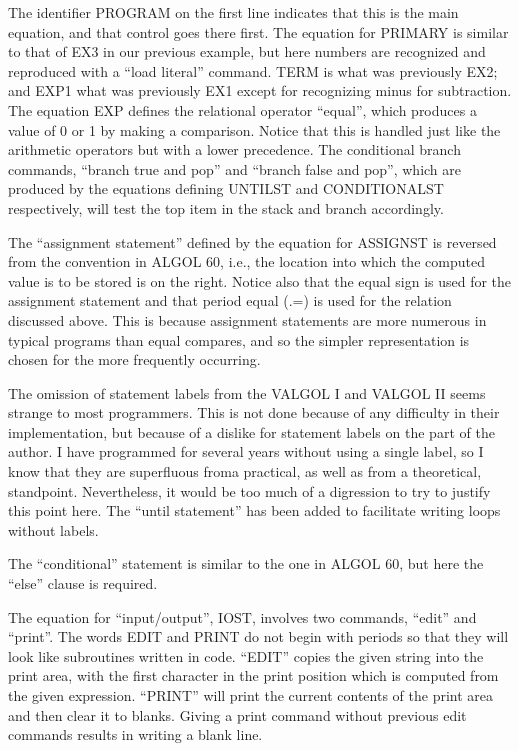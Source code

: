 \documentclass[twocolumn]{article}
\begin{document}
The identifier PROGRAM on the first line indicates that this is the main
equation, and that control goes there first.
The equation for PRIMARY is similar to that of EX3 in our previous example,
but here numbers are recognized and reproduced with a ``load literal'' command.
TERM is what was previously EX2; and EXP1 what was previously EX1 except for
recognizing minus for subtraction.
The equation EXP defines the relational operator ``equal'', which produces a
value of 0 or 1 by making a comparison.
Notice that this is handled just like the arithmetic operators but with a
lower precedence. The conditional branch commands, ``branch true and pop'' and
``branch false and pop'', which are produced by the equations defining UNTILST
and CONDITIONALST respectively, will test the top item in the stack and branch
accordingly.

The ``assignment statement'' defined by the equation for ASSIGNST is reversed
from the convention in ALGOL 60, i.e., the location into which the computed 
value is to be stored is on the right.
Notice also that the equal sign is used for the assignment statement and that
period equal (.=) is used for the relation discussed above.
This is because assignment statements are more numerous in typical programs than
equal compares, and so the simpler representation is chosen for the more
frequently occurring.

The omission of statement labels from the VALGOL I and VALGOL II seems strange
to most programmers. This is not done because of any difficulty in their
implementation, but because of a dislike for statement labels on the part of
the author. I have programmed for several years without using a single label,
so I know that they are superfluous froma practical, as well as from a
theoretical, standpoint.
Nevertheless, it would be too much of a digression to try to justify this point
here.
The ``until statement'' has been added to facilitate writing loops without labels.

The ``conditional'' statement is similar to the one in ALGOL 60, but here the
``else'' clause is required.

The equation for ``input/output'', IOST, involves two commands, ``edit'' and 
``print''.
The words EDIT and PRINT do not begin with periods so that they will look like
subroutines written in code.
``EDIT'' copies the given string into the print area, with the first character
in the print position which is computed from the given expression.
``PRINT'' will print the current contents of the print area and then clear it
to blanks.
Giving a print command without previous edit commands results in writing a blank
line.
\end{document}
